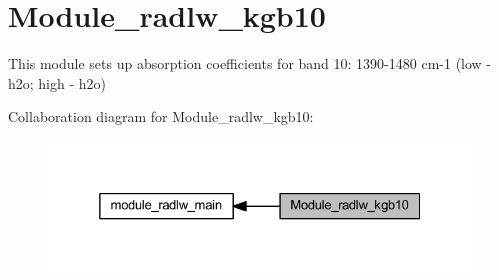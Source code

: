 \hypertarget{group__module__radlw__kgb10}{}\section{Module\+\_\+radlw\+\_\+kgb10}
\label{group__module__radlw__kgb10}


This module sets up absorption coefficients for band 10\+: 1390-\/1480 cm-\/1 (low -\/ h2o; high -\/ h2o)  


Collaboration diagram for Module\+\_\+radlw\+\_\+kgb10\+:\nopagebreak
\begin{figure}[H]
\begin{center}
\leavevmode
\includegraphics[width=325pt]{group__module__radlw__kgb10}
\end{center}
\end{figure}
